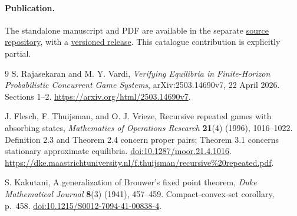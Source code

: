 \documentclass[11pt]{article}
\begin{document}
\paragraph{Publication.}
The standalone manuscript and PDF are available in the separate
\href{https://github.com/jbaelaw/concurrent-reachability-partial-results/tree/7c08ed6e2eb900855d70d68938de25e3dc303bea}{source repository}, with a
\href{https://github.com/jbaelaw/concurrent-reachability-partial-results/releases/tag/v1.0.0}{versioned release}.
This catalogue contribution is explicitly partial.

\begin{thebibliography}{9}
S. Rajasekaran and M. Y. Vardi,
\emph{Verifying Equilibria in Finite-Horizon Probabilistic Concurrent Game
Systems}, arXiv:2503.14690v7, 22 April 2026.
Sections 1--2.
\url{https://arxiv.org/html/2503.14690v7}.

J. Flesch, F. Thuijsman, and O. J. Vrieze,
Recursive repeated games with absorbing states,
\emph{Mathematics of Operations Research} \textbf{21}(4) (1996), 1016--1022.
Definition 2.3 and Theorem 2.4 concern proper pairs; Theorem 3.1 concerns
stationary approximate equilibria.
\href{https://doi.org/10.1287/moor.21.4.1016}{doi:10.1287/moor.21.4.1016}.
\url{https://dke.maastrichtuniversity.nl/f.thuijsman/recursive%20repeated.pdf}.

S. Kakutani, A generalization of Brouwer's fixed point theorem,
\emph{Duke Mathematical Journal} \textbf{8}(3) (1941), 457--459.
Compact-convex-set corollary, p.~458.
\href{https://doi.org/10.1215/S0012-7094-41-00838-4}{doi:10.1215/S0012-7094-41-00838-4}.
\end{thebibliography}
\end{document}
